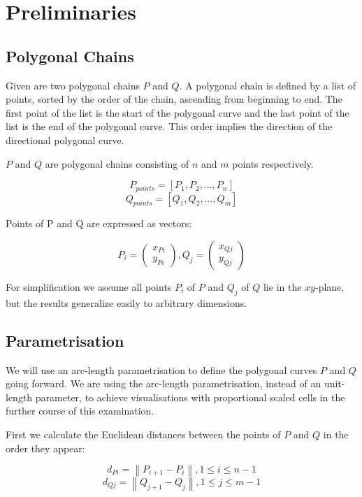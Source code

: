 \section{Preliminaries}
\subsection{Polygonal Chains}

Given are two polygonal chains $P$ and $Q$. A polygonal chain is defined by a list of points, sorted by the order of the chain, ascending from beginning to end. The first point of the list is the start of the polygonal curve and the last point of the list is the end of the polygonal curve. This order implies the direction of the directional polygonal curve.

$P$ and $Q$ are polygonal chains consisting of $n$ and $m$ points respectively.

$$P_{points} = [P_1, P_2, …, P_n]$$
$$Q_{points} = [Q_1, Q_2, …, Q_m]$$

Points of P and Q are expressed as vectors:

$$P_{i} = \begin{pmatrix}x_{Pi} \\ y_{Pi}\end{pmatrix}, Q_{j} = \begin{pmatrix}x_{Qj} \\ y_{Qj}\end{pmatrix}$$

For simplification we assume all points $P_{i}$ of $P$ and $Q_{j}$ of $Q$ lie in the $xy$-plane, but the results generalize easily to arbitrary dimensions\cite{rotelex}.

\subsection{Parametrisation}

We will use an arc-length parametrisation to define the polygonal curves $P$ and $Q$ going forward. We are using the arc-length parametrisation, instead of an unit-length parameter, to achieve visualisations with proportional scaled cells in the further course of this examination.

First we calculate the Euclidean distances between the points of $P$ and $Q$ in the order they appear:

$$d_{Pi} = \left\|P_{i+1} - P_{i}\right\|, 1 \leq i \leq n-1$$
$$d_{Qj} = \left\|Q_{j+1} - Q_{j}\right\|, 1 \leq j \leq m-1$$

